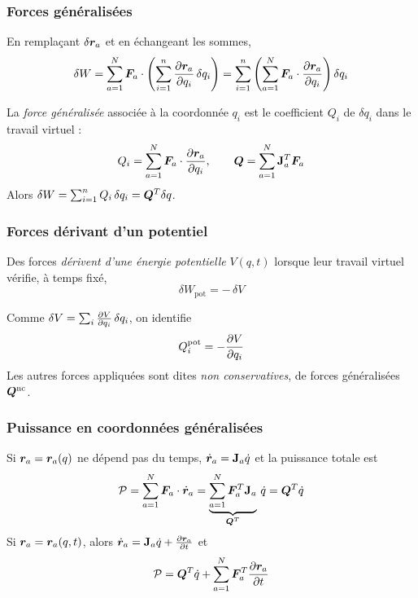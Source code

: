 \subsubsection{Forces généralisées}

En remplaçant $\delta\bm{r}_a$ et en échangeant les sommes,
\[
    \delta W
    = \sum_{a=1}^{N}\bm{F}_a\cdot
    \left(\sum_{i=1}^{n}\frac{\partial \bm{r}_a}{\partial q_i}\,\delta q_i\right)
    = \sum_{i=1}^{n}\left(\sum_{a=1}^{N}\bm{F}_a\cdot
    \frac{\partial \bm{r}_a}{\partial q_i}\right)\delta q_i
\]

\begin{definition}
    La \emph{force généralisée} associée à la coordonnée $q_i$ est le
    coefficient $Q_i$ de $\delta q_i$ dans le travail virtuel :
    \[
        Q_i = \sum_{a=1}^{N}\bm{F}_a\cdot\frac{\partial \bm{r}_a}{\partial q_i},
        \qquad
        \bm{Q} = \sum_{a=1}^{N}\mathbf{J}_a^T\bm{F}_a
    \]
    Alors $\delta W = \sum_{i=1}^{n}Q_i\,\delta q_i = \bm{Q}^T\delta q$.
\end{definition}

\subsubsection{Forces dérivant d'un potentiel}

\begin{definition}
    Des forces \emph{dérivent d'une énergie potentielle} $V(q,t)$
    lorsque leur travail virtuel vérifie, à temps fixé,
    \[
        \delta W_{\mathrm{pot}} = -\,\delta V
    \]
\end{definition}

Comme $\delta V = \sum_i\frac{\partial V}{\partial q_i}\,\delta q_i$, on identifie
\[
    Q_i^{\mathrm{pot}} = -\frac{\partial V}{\partial q_i}
\]
Les autres forces appliquées sont dites \emph{non conservatives}, de
forces généralisées $\bm{Q}^{\mathrm{nc}}$.

\subsubsection{Puissance en coordonnées généralisées}

Si $\bm{r}_a = \bm{r}_a(q)$ ne dépend pas du temps,
$\dot{\bm{r}}_a = \mathbf{J}_a\dot q$ et la puissance totale est
\[
    \mathcal{P} = \sum_{a=1}^{N}\bm{F}_a\cdot\dot{\bm{r}}_a
    = \underbrace{\sum_{a=1}^{N}\bm{F}_a^T\mathbf{J}_a}_{\bm{Q}^T}\,\dot q
    = \bm{Q}^T\dot q
\]
Si $\bm{r}_a = \bm{r}_a(q,t)$, alors $\dot{\bm{r}}_a =
\mathbf{J}_a\dot q + \frac{\partial \bm{r}_a}{\partial t}$ et
\[
    \mathcal{P} = \bm{Q}^T\dot q
    + \sum_{a=1}^{N}\bm{F}_a^T\frac{\partial \bm{r}_a}{\partial t}
\]

